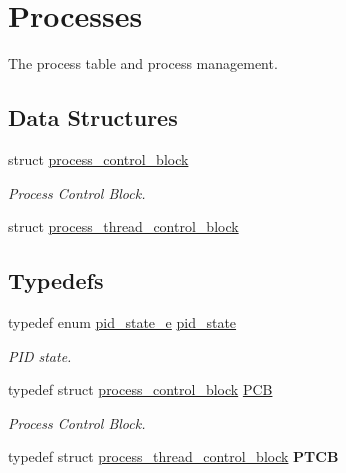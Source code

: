 \hypertarget{group__proc}{}\section{Processes}
\label{group__proc}


The process table and process management.  


\subsection*{Data Structures}
\begin{DoxyCompactItemize}
\item 
struct \hyperlink{structprocess__control__block}{process\+\_\+control\+\_\+block}
\begin{DoxyCompactList}\small\item\em Process Control Block. \end{DoxyCompactList}\item 
struct \hyperlink{structprocess__thread__control__block}{process\+\_\+thread\+\_\+control\+\_\+block}
\end{DoxyCompactItemize}
\subsection*{Typedefs}
\begin{DoxyCompactItemize}
\item 
typedef enum \hyperlink{group__proc_ga4f133ac5f9b2ca9c1446889baee1dc05}{pid\+\_\+state\+\_\+e} \hyperlink{group__proc_gade1eea4d20492c4c97263201145e5097}{pid\+\_\+state}
\begin{DoxyCompactList}\small\item\em P\+ID state. \end{DoxyCompactList}\item 
typedef struct \hyperlink{structprocess__control__block}{process\+\_\+control\+\_\+block} \hyperlink{group__proc_ga91aaadf0c3f9cef2293a99c69795323f}{P\+CB}
\begin{DoxyCompactList}\small\item\em Process Control Block. \end{DoxyCompactList}\item 
typedef struct \hyperlink{structprocess__thread__control__block}{process\+\_\+thread\+\_\+control\+\_\+block} {\bfseries P\+T\+CB}\hypertarget{group__proc_ga2115e4c199a702aaf36f4571877bf013}{}\label{group__proc_ga2115e4c199a702aaf36f4571877bf013}

\end{DoxyCompactItemize}
